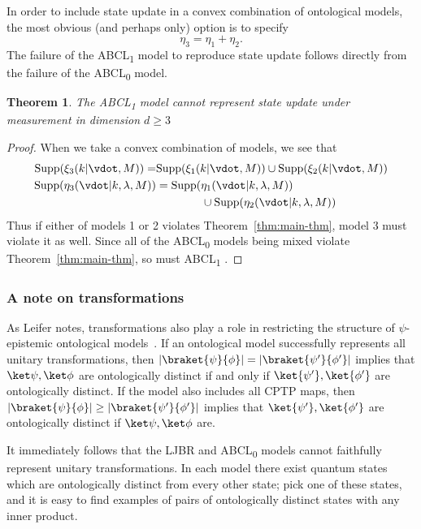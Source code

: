 \documentclass[%
 reprint,
superscriptaddress,
nofootinbib,
 amsmath,amssymb,
 prx, 
 accepted=2019-09-27,
]{quantumarticle}
\newtheorem{theorem}{Theorem}
\newcommand{\supp}{\textup{Supp}}
\newcommand{\abclz}{{ABCL\textsubscript{0}} }
\newcommand{\abclo}{{ABCL\textsubscript{1}} }
\begin{document}
In order to include state update in a convex combination of
ontological models, the most obvious (and perhaps only) option is to
specify
\begin{equation}
  \eta_3=\eta_1+\eta_2.
\end{equation}
The failure of the \abclo model to reproduce state update follows
directly from the failure of the \abclz model.
\begin{theorem}
  The \abclo model cannot represent state update under measurement in
  dimension $d\geq3$
\end{theorem}
\begin{proof}
  When we take a convex combination of models, we see that
  \begin{align*}
    \supp(\xi_3(k|\vdot,M))           = &\supp(\xi_1(k|\vdot,M)) \cup \supp(\xi_2(k|\vdot,M)) \\
    \supp(\eta_3(\vdot|k,\lambda,M)) & =\supp(\eta_1(\vdot|k,\lambda,M))                      \\
                                     & \qquad\qquad\cup \supp(\eta_2(\vdot|k,\lambda,M))
  \end{align*}
  Thus if either of models 1 or 2 violates Theorem~\ref{thm:main-thm},
  model 3 must violate it as well.  Since all of the \abclz models
  being mixed violate Theorem~\ref{thm:main-thm}, so must \abclo.
\end{proof}



\subsubsection{A note on transformations}

As Leifer notes, transformations also play a role in restricting the
structure of $\psi$-epistemic ontological models~\cite[Section
8.1]{Leiferquantumstatereal2014}. If an ontological model successfully
represents all unitary transformations, then
$\left|\braket{\psi}{\phi}\right|=\left|\braket{\psi'}{\phi'}\right|$
implies that $\ket\psi,\ket\phi$ are ontologically distinct if and
only if $\ket{\psi'},\ket{\phi'}$ are ontologically distinct. If the
model also includes all CPTP maps, then
$\left|\braket{\psi}{\phi}\right|\geq\left|\braket{\psi'}{\phi'}\right|$
implies that $\ket{\psi'},\ket{\phi'}$ are ontologically distinct if
$\ket\psi,\ket\phi$ are.

It immediately follows that the LJBR and \abclz models cannot
faithfully represent unitary transformations. In each model there
exist quantum states which are ontologically distinct from every other
state; pick one of these states, and it is easy to find examples of
pairs of ontologically distinct states with any inner product.
\end{document}
